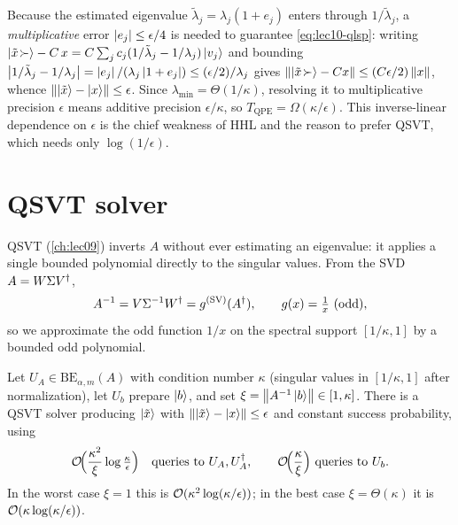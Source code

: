 \begin{remark}
\label{rem:lec10-mult}
Because the estimated eigenvalue $\tilde\lambda_j=\lambda_j(1+e_j)$ enters through
$1/\tilde\lambda_j$, a \emph{multiplicative} error $\left\lvert e_j \right\rvert\le\epsilon/4$ is needed to
guarantee \eqref{eq:lec10-qlsp}: writing $\ket{\tilde x\!\succ}-C\,x
=C\sum_j c_j(1/\tilde\lambda_j-1/\lambda_j)\ket{v_j}$ and bounding
$\left\lvert 1/\tilde\lambda_j-1/\lambda_j \right\rvert=\left\lvert e_j \right\rvert/(\lambda_j\left\lvert 1+e_j \right\rvert)
\le(\epsilon/2)/\lambda_j$ gives $\left\lVert \ket{\tilde x\!\succ}-C x \right\rVert\le(C\epsilon/2)\left\lVert x \right\rVert$,
whence $\left\lVert \ket{\tilde x}-\ket x \right\rVert\le\epsilon$. Since $\lambda_{\min}=\Theta(1/\kappa)$,
resolving it to multiplicative precision $\epsilon$ means additive precision
$\epsilon/\kappa$, so $T_{\mathrm{QPE}}=\Omega(\kappa/\epsilon)$. This inverse-linear
dependence on $\epsilon$ is the chief weakness of HHL and the reason to prefer QSVT,
which needs only $\log(1/\epsilon)$.
\end{remark}

\section{QSVT solver}
\label{sec:lec10-3}

QSVT (\cref{ch:lec09}) inverts $A$ without ever estimating an eigenvalue: it applies a
single bounded polynomial directly to the singular values. From the SVD
$A=W\Sigma V^{\dagger}$,
\begin{equation}
  A^{-1}=V\Sigma^{-1}W^{\dagger}=g^{(\mathrm{SV})}(A^{\dagger}),\qquad g(x)=\tfrac1x\ \text{(odd)},
  \label{eq:lec10-qsvt-target}
\end{equation}
so we approximate the odd function $1/x$ on the spectral support $[1/\kappa,1]$ by a
bounded odd polynomial.

\begin{theorem}
\label{thm:lec10-qsvt}
Let $U_A\in\mathrm{BE}_{\alpha,m}(A)$ with condition number $\kappa$ (singular values in
$[{1/\kappa},1]$ after normalization), let $U_b$ prepare $\ket b$, and set
$\xi=\left\lVert A^{-1}\ket b \right\rVert\in[1,\kappa]$. There is a QSVT solver producing $\ket{\tilde x}$
with $\left\lVert \ket{\tilde x}-\ket x \right\rVert\le\epsilon$ and constant success probability, using
\begin{equation}
  \mathcal{O}\!\Bigl(\frac{\kappa^2}{\xi}\log\tfrac\kappa\epsilon\Bigr)
  \quad\text{queries to } U_A,U_A^{\dagger},\qquad
  \mathcal{O}\!\Bigl(\frac{\kappa}{\xi}\Bigr)\ \text{queries to } U_b.
  \label{eq:lec10-qsvt-cost}
\end{equation}
In the worst case $\xi=1$ this is $\mathcal{O}(\kappa^2\log(\kappa/\epsilon))$; in the best
case $\xi=\Theta(\kappa)$ it is $\mathcal{O}(\kappa\log(\kappa/\epsilon))$.
\end{theorem}

